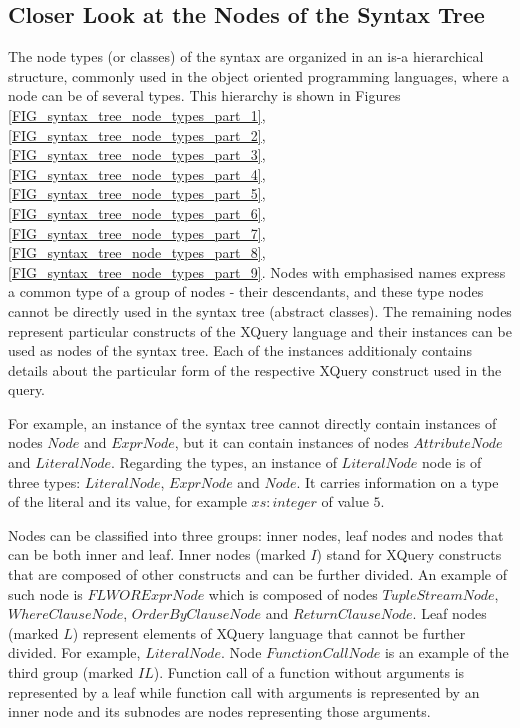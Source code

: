 \subsection{Closer Look at the Nodes of the Syntax Tree}
The node types (or classes) of the syntax are organized in an is-a hierarchical structure, commonly used in the object oriented programming languages, where a node can be of several types. This hierarchy is shown in Figures \ref{FIG_syntax_tree_node_types_part_1}, \ref{FIG_syntax_tree_node_types_part_2}, \ref{FIG_syntax_tree_node_types_part_3}, \ref{FIG_syntax_tree_node_types_part_4}, \ref{FIG_syntax_tree_node_types_part_5}, \ref{FIG_syntax_tree_node_types_part_6}, \ref{FIG_syntax_tree_node_types_part_7}, \ref{FIG_syntax_tree_node_types_part_8}, \ref{FIG_syntax_tree_node_types_part_9}. Nodes with emphasised names express a common type of a group of nodes - their descendants, and these type nodes cannot be directly used in the syntax tree (abstract classes). The remaining nodes represent particular constructs of the XQuery language and their instances can be used as nodes of the syntax tree. Each of the instances additionaly contains details about the particular form of the respective XQuery construct used in the query.


For example, an instance of the syntax tree cannot directly contain instances of nodes $Node$ and $ExprNode$, but it can contain instances of nodes $AttributeNode$ and $LiteralNode$. Regarding the types, an instance of $LiteralNode$ node is of three types: $LiteralNode$, $ExprNode$ and $Node$. It carries information on a type of the literal and its value, for example $xs:integer$ of value $5$.


Nodes can be classified into three groups: inner nodes, leaf nodes and nodes that can be both inner and leaf. Inner nodes (marked $I$) stand for XQuery constructs that are composed of other constructs and can be further divided. An example of such node is $FLWORExprNode$ which is composed of nodes $TupleStreamNode$, $WhereClauseNode$, $OrderByClauseNode$ and $ReturnClauseNode$. Leaf nodes (marked $L$) represent elements of XQuery language that cannot be further divided. For example, $LiteralNode$. Node $FunctionCallNode$ is an example of the third group (marked $IL$). Function call of a function without arguments is represented by a leaf while function call with arguments is represented by an inner node and its subnodes are nodes representing those arguments.

